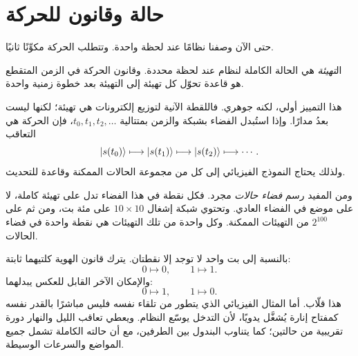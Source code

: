 \section{حالة وقانون للحركة}

حتى الآن وصفنا نظامًا عند لحظة واحدة. وتتطلب الحركة مكوِّنًا ثانيًا.

\begin{definition}
ال\emph{تهيئة} هي الحالة الكاملة لنظام عند لحظة محددة. وقانون الحركة في الزمن المتقطع هو قاعدة تحوّل كل تهيئة إلى التهيئة بعد خطوة زمنية واحدة.
\end{definition}

هذا التمييز أولي، لكنه جوهري. فاللقطة الآنية لتوزيع إلكترونات هي تهيئة؛ لكنها ليست بعدُ مدارًا. وإذا استُبدل الفضاء بشبكة والزمن بمتتالية \(t_0,t_1,t_2,\ldots\)، فإن الحركة هي التعاقب
\begin{equation}
  \left\lvert s(t_0)\right\rangle
  \longmapsto
  \left\lvert s(t_1)\right\rangle
  \longmapsto
  \left\lvert s(t_2)\right\rangle
  \longmapsto\cdots.
  \label{eq:l01-discrete-motion}
\end{equation}
ولذلك يحتاج النموذج الفيزيائي إلى كل من مجموعة الحالات الممكنة وقاعدة للتحديث.

\begin{classroomqa}
\end{classroomqa}

ومن المفيد رسم \emph{فضاء حالات} مجرد. فكل نقطة في هذا الفضاء تدل على تهيئة كاملة، لا على موضع في الفضاء العادي. وتحتوي شبكة إشغال \(10\times10\) على مئة بت، ومن ثم على \(2^{100}\) من التهيئات الممكنة. وكل واحدة من تلك التهيئات هي نقطة واحدة في فضاء الحالات.

بالنسبة إلى بت واحد لا توجد إلا نقطتان. يترك قانون الهوية كلتيهما ثابتة:
\begin{equation}
  0\mapsto0,
  \qquad
  1\mapsto1.
  \label{eq:l01-identity-update}
\end{equation}
والإمكان الآخر القابل للعكس يبدلهما:
\begin{equation}
  0\mapsto1,
  \qquad
  1\mapsto0.
  \label{eq:l01-flip-update}
\end{equation}
هذا قلّاب. أما المثال الفيزيائي الذي يتطور من تلقاء نفسه فليس مباشرًا بالقدر نفسه كمفتاح إنارة يُشغَّل يدويًا، لأن التدخل يوسّع النظام. ويعطي تعاقب الليل والنهار دورة تقريبية من حالتين؛ كما يتناوب البندول بين الطرفين، مع أن حالته الكاملة تشمل جميع المواضع والسرعات الوسيطة.

